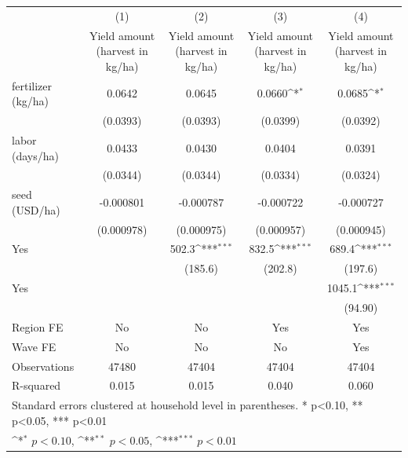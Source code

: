 {
\def\sym#1{\ifmmode^{#1}\else\(^{#1}\)\fi}
\begin{tabular}{l*{4}{c}}
\toprule
                    &\multicolumn{1}{c}{(1)}&\multicolumn{1}{c}{(2)}&\multicolumn{1}{c}{(3)}&\multicolumn{1}{c}{(4)}\\
                    &\multicolumn{1}{c}{Yield amount (harvest in kg/ha)}&\multicolumn{1}{c}{Yield amount (harvest in kg/ha)}&\multicolumn{1}{c}{Yield amount (harvest in kg/ha)}&\multicolumn{1}{c}{Yield amount (harvest in kg/ha)}\\
\midrule
fertilizer (kg/ha)  &      0.0642         &      0.0645         &      0.0660\sym{*}  &      0.0685\sym{*}  \\
                    &    (0.0393)         &    (0.0393)         &    (0.0399)         &    (0.0392)         \\
\addlinespace
labor (days/ha)     &      0.0433         &      0.0430         &      0.0404         &      0.0391         \\
                    &    (0.0344)         &    (0.0344)         &    (0.0334)         &    (0.0324)         \\
\addlinespace
seed (USD/ha)       &   -0.000801         &   -0.000787         &   -0.000722         &   -0.000727         \\
                    &  (0.000978)         &  (0.000975)         &  (0.000957)         &  (0.000945)         \\
\addlinespace
Yes                 &                     &       502.3\sym{***}&       832.5\sym{***}&       689.4\sym{***}\\
                    &                     &     (185.6)         &     (202.8)         &     (197.6)         \\
\addlinespace
Yes                 &                     &                     &                     &      1045.1\sym{***}\\
                    &                     &                     &                     &     (94.90)         \\
\addlinespace
Region FE           &          No         &          No         &         Yes         &         Yes         \\
\addlinespace
Wave FE             &          No         &          No         &          No         &         Yes         \\
\midrule
Observations        &       47480         &       47404         &       47404         &       47404         \\
R-squared           &       0.015         &       0.015         &       0.040         &       0.060         \\
\bottomrule
\multicolumn{5}{l}{\footnotesize Standard errors clustered  at household level in parentheses.  * p<0.10, ** p<0.05, *** p<0.01}\\
\multicolumn{5}{l}{\footnotesize \sym{*} \(p<0.10\), \sym{**} \(p<0.05\), \sym{***} \(p<0.01\)}\\
\end{tabular}
}
